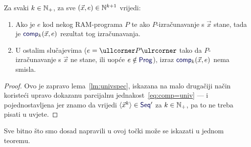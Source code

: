 \begin{korolar}[{name=[specifikacija univerzalnih funkcija]}]\label{kor:compspec}
Za svaki $k\in{\mathbb N}_+$, za sve $(\vec x,e)\in{\mathbb N}^{k+1}$ vrijedi:
\begin{enumerate}
    \item\label{tv:comp} Ako je $e$ kod nekog RAM-programa $P$ te ako $P$-izračunavanje s $\vec x$ stane, tada je $\f{comp}_k(\vec x,e)$ rezultat tog izračunavanja.
    \item\label{tv:ncomp} U ostalim slučajevima ($e=\kprog{P}$ tako da $P$-izračunavanje s $\vec x$ ne stane, ili uopće $e\notin\f{Prog}$), izraz $\f{comp}_k(\vec x,e)$ nema smisla.
\end{enumerate}
\end{korolar}
\begin{proof}
Ovo je zapravo lema~\ref{lm:univspec}, iskazana na malo drugačiji način koristeći upravo dokazanu parcijalnu jednakost~\eqref{eq:comp=univ} --- i pojednostavljena jer znamo da vrijedi $\langle\vec x^k\rangle\in\f{Seq}'$ za $k\in{\mathbb N}_+$, pa to ne treba pisati u uvjete.
\end{proof}


Sve bitno što smo dosad napravili u ovoj točki može se iskazati u jednom teoremu.

